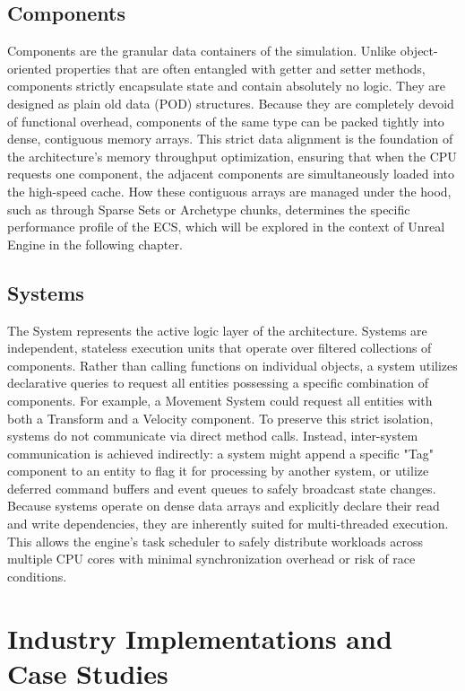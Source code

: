 \subsection{Components}
Components are the granular data containers of the simulation. Unlike object-oriented properties that are often entangled with getter and setter methods, components strictly encapsulate state and contain absolutely no logic. They are designed as plain old data (POD) structures. Because they are completely devoid of functional overhead, components of the same type can be packed tightly into dense, contiguous memory arrays. This strict data alignment is the foundation of the architecture's memory throughput optimization, ensuring that when the CPU requests one component, the adjacent components are simultaneously loaded into the high-speed cache.
How these contiguous arrays are managed under the hood, such as through Sparse Sets or Archetype chunks, determines the specific performance profile of the ECS, which will be explored in the context of Unreal Engine in the following chapter.

\subsection{Systems}
The System represents the active logic layer of the architecture. Systems are independent, stateless execution units that operate over filtered collections of components. Rather than calling functions on individual objects, a system utilizes declarative queries to request all entities possessing a specific combination of components. For example, a Movement System could request all entities with both a Transform and a Velocity component. 
To preserve this strict isolation, systems do not communicate via direct method calls. Instead, inter-system communication is achieved indirectly: a system might append a specific "Tag" component to an entity to flag it for processing by another system, or utilize deferred command buffers and event queues to safely broadcast state changes.
Because systems operate on dense data arrays and explicitly declare their read and write dependencies, they are inherently suited for multi-threaded execution. This allows the engine's task scheduler to safely distribute workloads across multiple CPU cores with minimal synchronization overhead or risk of race conditions.

\section{Industry Implementations and Case Studies}

